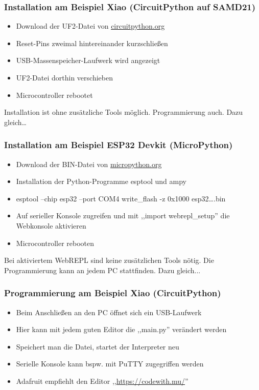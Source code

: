 \documentclass{beamer}
\begin{document}
\begin{frame}
\frametitle{Installation am Beispiel Xiao (CircuitPython auf SAMD21)}

\begin{itemize}
\item Download der UF2-Datei von \href{https://circuitpython.org/}{circuitpython.org}
\item Reset-Pins zweimal hintereinander kurzschließen 
\item USB-Massenspeicher-Laufwerk wird angezeigt
\item UF2-Datei dorthin verschieben 
\item Microcontroller rebootet
\end{itemize}

Installation ist ohne zusätzliche Tools möglich. Programmierung auch. Dazu gleich…
\end{frame}

\begin{frame}
\frametitle{Installation am Beispiel ESP32 Devkit (MicroPython)}

\begin{itemize}
\item Download der BIN-Datei von \href{https://micropython.org/}{micropython.org}
\item Installation der Python-Programme esptool und ampy
\item esptool --chip esp32 --port COM4 write\_flash -z 0x1000 esp32….bin
\item Auf serieller Konsole zugreifen und mit ,,import webrepl\_setup'' die Webkonsole aktivieren
\item Microcontroller rebooten
\end{itemize}

Bei aktiviertem WebREPL sind keine zusätzlichen Tools nötig. Die Programmierung kann an jedem PC stattfinden. Dazu gleich...

\end{frame}

\begin{frame}
\frametitle{Programmierung am Beispiel Xiao (CircuitPython)}

\begin{itemize}
\item Beim Anschließen an den PC öffnet sich ein USB-Laufwerk
\item Hier kann mit jedem guten Editor die ,,main.py'' verändert werden
\item Speichert man die Datei, startet der Interpreter neu
\item Serielle Konsole kann bspw. mit PuTTY zugegriffen werden
\item Adafruit empfiehlt den Editor ,,\href{Mu}{https://codewith.mu/}''
\end{itemize}

\end{frame}
\end{document}
